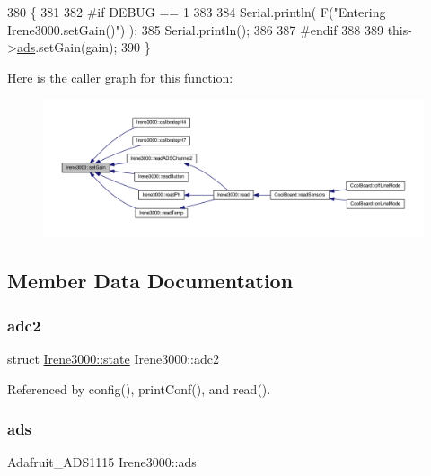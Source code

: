 \begin{DoxyCode}
380 \{
381 
382 \textcolor{preprocessor}{#if DEBUG == 1  }
383 
384     Serial.println( F(\textcolor{stringliteral}{"Entering Irene3000.setGain()"}) );
385     Serial.println();
386 
387 \textcolor{preprocessor}{#endif}
388 
389     this->\hyperlink{classIrene3000_a1215e77ba761c9908d80d691f149e135}{ads}.setGain(gain);
390 \}
\end{DoxyCode}
Here is the caller graph for this function\+:
\nopagebreak
\begin{figure}[H]
\begin{center}
\leavevmode
\includegraphics[width=350pt]{classIrene3000_aff7c5da186b388e7272e63ff88a20c34_icgraph}
\end{center}
\end{figure}


\subsection{Member Data Documentation}
\mbox{\label{classIrene3000_aae3a95a1c83c766cd2f299ce471c337e}} 
\subsubsection{\texorpdfstring{adc2}{adc2}}
{\footnotesize\ttfamily struct \hyperlink{structIrene3000_1_1state}{Irene3000\+::state} Irene3000\+::adc2\hspace{0.3cm}{\ttfamily [private]}}



Referenced by config(), print\+Conf(), and read().

\mbox{\label{classIrene3000_a1215e77ba761c9908d80d691f149e135}} 
\subsubsection{\texorpdfstring{ads}{ads}}
{\footnotesize\ttfamily Adafruit\+\_\+\+A\+D\+S1115 Irene3000\+::ads\hspace{0.3cm}{\ttfamily [private]}}



